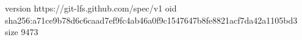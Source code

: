 version https://git-lfs.github.com/spec/v1
oid sha256:a71ce9b78d6c6caad7ef9fc4ab46a0f9c1547647b8fe8821acf7da42a1105bd3
size 9473

